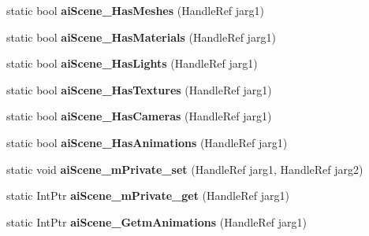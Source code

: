 \begin{DoxyCompactItemize}
\item 
\hypertarget{class_assimp_p_i_n_v_o_k_e_a0328c7bb513eeb65545bfa79173b4379}{static bool {\bfseries ai\+Scene\+\_\+\+Has\+Meshes} (Handle\+Ref jarg1)}\label{class_assimp_p_i_n_v_o_k_e_a0328c7bb513eeb65545bfa79173b4379}

\item 
\hypertarget{class_assimp_p_i_n_v_o_k_e_ae2f8d88ddd58519f4805345f1b35f903}{static bool {\bfseries ai\+Scene\+\_\+\+Has\+Materials} (Handle\+Ref jarg1)}\label{class_assimp_p_i_n_v_o_k_e_ae2f8d88ddd58519f4805345f1b35f903}

\item 
\hypertarget{class_assimp_p_i_n_v_o_k_e_aba310be78eea86d6f246e0a219b9d9fe}{static bool {\bfseries ai\+Scene\+\_\+\+Has\+Lights} (Handle\+Ref jarg1)}\label{class_assimp_p_i_n_v_o_k_e_aba310be78eea86d6f246e0a219b9d9fe}

\item 
\hypertarget{class_assimp_p_i_n_v_o_k_e_ab128321ff6d89d537e9ded0b785aadf2}{static bool {\bfseries ai\+Scene\+\_\+\+Has\+Textures} (Handle\+Ref jarg1)}\label{class_assimp_p_i_n_v_o_k_e_ab128321ff6d89d537e9ded0b785aadf2}

\item 
\hypertarget{class_assimp_p_i_n_v_o_k_e_a985c7aa15e46ba49fd06df69d576484e}{static bool {\bfseries ai\+Scene\+\_\+\+Has\+Cameras} (Handle\+Ref jarg1)}\label{class_assimp_p_i_n_v_o_k_e_a985c7aa15e46ba49fd06df69d576484e}

\item 
\hypertarget{class_assimp_p_i_n_v_o_k_e_afbcd7d2620126b98bc527fda2fe8cec1}{static bool {\bfseries ai\+Scene\+\_\+\+Has\+Animations} (Handle\+Ref jarg1)}\label{class_assimp_p_i_n_v_o_k_e_afbcd7d2620126b98bc527fda2fe8cec1}

\item 
\hypertarget{class_assimp_p_i_n_v_o_k_e_aee7f509fc8a077e6a67c8912e6ead93b}{static void {\bfseries ai\+Scene\+\_\+m\+Private\+\_\+set} (Handle\+Ref jarg1, Handle\+Ref jarg2)}\label{class_assimp_p_i_n_v_o_k_e_aee7f509fc8a077e6a67c8912e6ead93b}

\item 
\hypertarget{class_assimp_p_i_n_v_o_k_e_a357bd46d7873831f3d98f4cc89becfb9}{static Int\+Ptr {\bfseries ai\+Scene\+\_\+m\+Private\+\_\+get} (Handle\+Ref jarg1)}\label{class_assimp_p_i_n_v_o_k_e_a357bd46d7873831f3d98f4cc89becfb9}

\item 
\hypertarget{class_assimp_p_i_n_v_o_k_e_ac0380cf06af13316fd2c68ad18ef1dd9}{static Int\+Ptr {\bfseries ai\+Scene\+\_\+\+Getm\+Animations} (Handle\+Ref jarg1)}\label{class_assimp_p_i_n_v_o_k_e_ac0380cf06af13316fd2c68ad18ef1dd9}


\end{DoxyCompactItemize}
